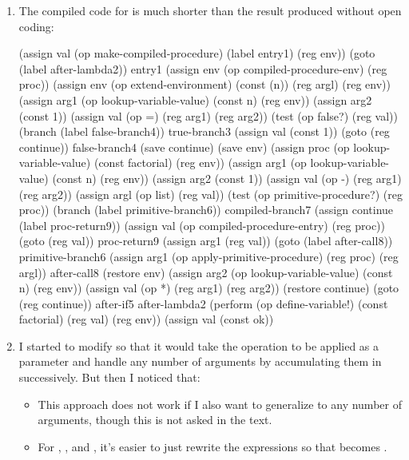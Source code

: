 \begin{exe}[5.38]
\begin{enumerate}
	\item The compiled code for  is much shorter than the 
	    result produced without open coding:
	    \begin{cscm}
		    (assign val (op make-compiled-procedure) (label entry1) (reg env))
		    (goto (label after-lambda2))
		entry1
		    (assign env (op compiled-procedure-env) (reg proc))
		    (assign env (op extend-environment) (const (n)) (reg argl) (reg env))
		    (assign arg1 (op lookup-variable-value) (const n) (reg env))
		    (assign arg2 (const 1))
		    (assign val (op =) (reg arg1) (reg arg2))
		    (test (op false?) (reg val))
		    (branch (label false-branch4))
		true-branch3
		    (assign val (const 1))
		    (goto (reg continue))
		false-branch4
		    (save continue)
		    (save env)
		    (assign proc (op lookup-variable-value) (const factorial) (reg env))
		    (assign arg1 (op lookup-variable-value) (const n) (reg env))
		    (assign arg2 (const 1))
		    (assign val (op -) (reg arg1) (reg arg2))
		    (assign argl (op list) (reg val))
		    (test (op primitive-procedure?) (reg proc))
		    (branch (label primitive-branch6))
		compiled-branch7
		    (assign continue (label proc-return9))
		    (assign val (op compiled-procedure-entry) (reg proc))
		    (goto (reg val))
		proc-return9
		    (assign arg1 (reg val))
		    (goto (label after-call8))
		primitive-branch6
		    (assign arg1 (op apply-primitive-procedure) (reg proc) (reg argl))
		after-call8
		    (restore env)
		    (assign arg2 (op lookup-variable-value) (const n) (reg env))
		    (assign val (op *) (reg arg1) (reg arg2))
		    (restore continue)
		    (goto (reg continue))
		after-if5
		after-lambda2
		    (perform (op define-variable!) (const factorial) (reg val) (reg env))
		    (assign val (const ok))
	    \end{cscm}

	\item I started to modify  so that it would take 
	    the operation to be applied as a parameter and handle any number of 
	    arguments by accumulating them in  successively. But then 
	    I noticed that:
	    \begin{itemize}
		\item This approach does not work if I also want to generalize 
		    \vscm{=} to any number of arguments, though this is not 
		    asked in the text.
		\item For \vscm{+}, \vscm{-}, \vscm{*} and \vscm{/}, it’s easier 
		    to just rewrite the expressions so that  
		    becomes .
	    \end{itemize}


\end{enumerate}
\end{exe}
